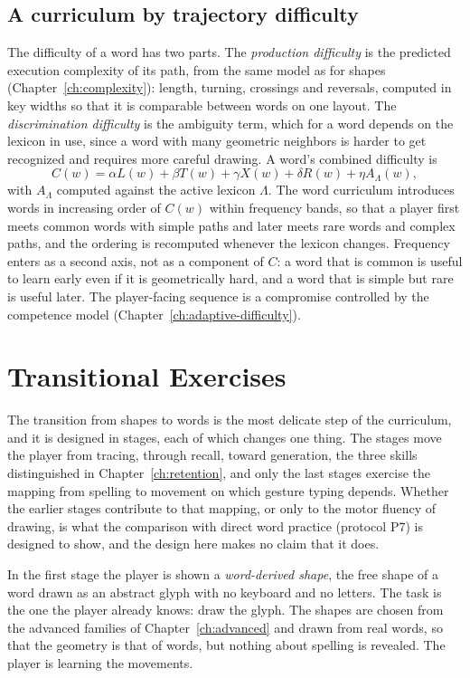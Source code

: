 

\section{A curriculum by trajectory difficulty}

The difficulty of a word has two parts. The \emph{production difficulty} is the predicted execution complexity of its path, from the same model as for shapes (Chapter~\ref{ch:complexity}): length, turning, crossings and reversals, computed in key widths so that it is comparable between words on one layout. The \emph{discrimination difficulty} is the ambiguity term, which for a word depends on the lexicon in use, since a word with many geometric neighbors is harder to get recognized and requires more careful drawing. A word's combined difficulty is
\[
C(w)=\alpha L(w)+\beta T(w)+\gamma X(w)+\delta R(w)+\eta A_{\Lambda}(w),
\]
with $A_\Lambda$ computed against the active lexicon $\Lambda$. The word curriculum introduces words in increasing order of $C(w)$ within frequency bands, so that a player first meets common words with simple paths and later meets rare words and complex paths, and the ordering is recomputed whenever the lexicon changes. Frequency enters as a second axis, not as a component of $C$: a word that is common is useful to learn early even if it is geometrically hard, and a word that is simple but rare is useful later. The player-facing sequence is a compromise controlled by the competence model (Chapter~\ref{ch:adaptive-difficulty}).

\chapter{Transitional Exercises}\label{ch:transitional}

The transition from shapes to words is the most delicate step of the curriculum, and it is designed in stages, each of which changes one thing. The stages move the player from tracing, through recall, toward generation, the three skills distinguished in Chapter~\ref{ch:retention}, and only the last stages exercise the mapping from spelling to movement on which gesture typing depends. Whether the earlier stages contribute to that mapping, or only to the motor fluency of drawing, is what the comparison with direct word practice (protocol P7) is designed to show, and the design here makes no claim that it does.

In the first stage the player is shown a \emph{word-derived shape}, the free shape of a word drawn as an abstract glyph with no keyboard and no letters. The task is the one the player already knows: draw the glyph. The shapes are chosen from the advanced families of Chapter~\ref{ch:advanced} and drawn from real words, so that the geometry is that of words, but nothing about spelling is revealed. The player is learning the movements.

